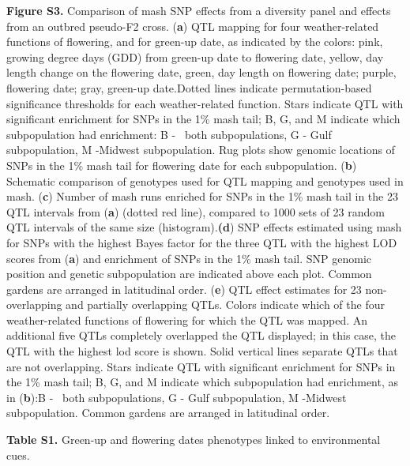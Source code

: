 \documentclass[
  letterpaper,
  DIV=11,
  numbers=noendperiod]{scrartcl}
\begin{document}
\textbf{Figure S3.} Comparison of mash SNP effects from a diversity
panel and effects from an outbred pseudo-F2 cross. (\textbf{a}) QTL
mapping for four weather-related functions of flowering, and for
green-up date, as indicated by the colors: pink, growing degree days
(GDD) from green-up date to flowering date, yellow, day length change on
the flowering date, green, day length on flowering date; purple,
flowering date; gray, green-up date.Dotted lines indicate
permutation-based significance thresholds for each weather-related
function. Stars indicate QTL with significant enrichment for SNPs in the
1\% mash tail; B, G, and M indicate which subpopulation had enrichment:
B -~ both subpopulations, G - Gulf subpopulation, M -Midwest
subpopulation. Rug plots show genomic locations of SNPs in the 1\% mash
tail for flowering date for each subpopulation. (\textbf{b}) Schematic
comparison of genotypes used for QTL mapping and genotypes used in mash.
(\textbf{c}) Number of mash runs enriched for SNPs in the 1\% mash tail
in the 23 QTL intervals from (\textbf{a}) (dotted red line), compared to
1000 sets of 23 random QTL intervals of the same size
(histogram).\textbf{(d}) SNP effects estimated using mash for SNPs with
the highest Bayes factor for the three QTL with the highest LOD scores
from (\textbf{a}) and enrichment of SNPs in the 1\% mash tail. SNP
genomic position and genetic subpopulation are indicated above each
plot. Common gardens are arranged in latitudinal order. (\textbf{e}) QTL
effect estimates for 23 non-overlapping and partially overlapping QTLs.
Colors indicate which of the four weather-related functions of flowering
for which the QTL was mapped. An additional five QTLs completely
overlapped the QTL displayed; in this case, the QTL with the highest lod
score is shown. Solid vertical lines separate QTLs that are not
overlapping. Stars indicate QTL with significant enrichment for SNPs in
the 1\% mash tail; B, G, and M indicate which subpopulation had
enrichment, as in (\textbf{b}):B -~ both subpopulations, G - Gulf
subpopulation, M -Midwest subpopulation. Common gardens are arranged in
latitudinal order.~

\textbf{Table S1.} Green-up and flowering dates phenotypes linked to
environmental cues.
\end{document}
